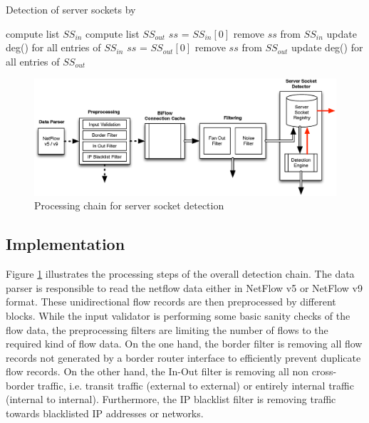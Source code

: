 
\begin{algorithm}[t!]
\caption{Detection of server sockets by \citet{Schatzmann:Mining,Schatzmann:Dissection, Schatzmann:Tracing}}
\label{alg:service_tracing_ss-detection}
\begin{algorithmic}
\STATE
\STATE compute list $SS_{in}$ 
\STATE compute list $SS_{out}$ 
\STATE
{}
        \STATE $ss$ = $SS_{in}[0]$ 
        \STATE remove $ss$ from $SS_{in}$
        \STATE update deg() for all entries of $SS_{in}$
    \ENDWHILE
        \STATE $ss$ = $SS_{out}[0]$ 
        \STATE remove $ss$ from $SS_{out}$
        \STATE update deg() for all entries of $SS_{out}$
    \ENDWHILE
\ENDWHILE
\end{algorithmic}
\end{algorithm}

\begin{figure}
	[ht] \centering
	\includegraphics[width=\linewidth]{images/Detection_chain.eps}
	\caption{Processing chain for server socket detection}
	\label{fig:detection_chain}
\end{figure}

\subsection{Implementation}
Figure \ref{fig:detection_chain} illustrates the processing steps of the overall detection chain. The data parser is responsible to read the netflow data either in NetFlow v5 or NetFlow v9 format. These unidirectional flow records are then preprocessed by different blocks. While the input validator is performing some basic sanity checks of the flow data, the preprocessing filters are limiting the number of flows to the required kind of flow data. On the one hand, the border filter is removing all flow records not generated by a border router interface to efficiently prevent duplicate flow records. On the other hand, the In-Out filter is removing all non cross-border traffic, i.e. transit traffic (external to external) or entirely internal traffic (internal to internal). Furthermore, the IP blacklist filter is removing traffic towards blacklisted IP addresses or networks.

